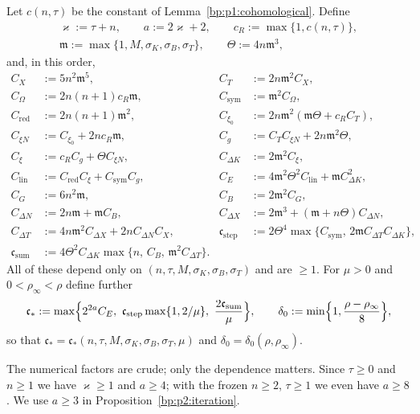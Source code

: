 \begin{definition}\label{bp:p2:constants}
Let $c(n,\tau)$ be the constant of Lemma~\ref{bp:p1:cohomological}. Define
\begin{gather*}
\varkappa:=\tau+n,\qquad a:=2\varkappa+2,\qquad c_R:=\max\{1,c(n,\tau)\},\\
\mathfrak m:=\max\{1,M,\sigma_K,\sigma_B,\sigma_T\},\qquad \Theta:=4n\mathfrak m^3,
\end{gather*}
and, in this order,
\begin{align*}
C_X&:=5n^2\mathfrak m^5, & C_T&:=2n\mathfrak m^2C_X,\\
C_\Omega&:=2n(n+1)c_R\mathfrak m, & C_{\mathrm{sym}}&:=\mathfrak m^2C_\Omega,\\
C_{\mathrm{red}}&:=2n(n+1)\mathfrak m^2, & C_{\xi_0}&:=2n\mathfrak m^2(\mathfrak m\Theta+c_RC_T),\\
C_{\xi N}&:=C_{\xi_0}+2nc_R\mathfrak m, & C_g&:=C_TC_{\xi N}+2n\mathfrak m^2\Theta,\\
C_\xi&:=c_RC_g+\Theta C_{\xi N}, & C_{\Delta K}&:=2\mathfrak m^2C_\xi,\\
C_{\mathrm{lin}}&:=C_{\mathrm{red}}C_\xi+C_{\mathrm{sym}}C_g, &
  C_E&:=4\mathfrak m^2\Theta^2C_{\mathrm{lin}}+\mathfrak mC_{\Delta K}^2,\\
C_G&:=6n^2\mathfrak m, & C_B&:=2\mathfrak m^2C_G,\\
C_{\Delta N}&:=2n\mathfrak m+\mathfrak mC_B, & C_{\Delta X}&:=2\mathfrak m^3+(\mathfrak m+n\Theta)C_{\Delta N},\\
C_{\Delta T}&:=4n\mathfrak m^2C_{\Delta X}+2nC_{\Delta N}C_X, &
  \mathfrak c_{\mathrm{step}}&:=2\Theta^4\max\{C_{\mathrm{sym}},\,2\mathfrak mC_{\Delta T}C_{\Delta K}\},\\
\mathfrak c_{\mathrm{sum}}&:=4\Theta^2C_{\Delta K}\max\{n,\,C_B,\,\mathfrak m^2C_{\Delta T}\}.
\end{align*}
All of these depend only on $(n,\tau,M,\sigma_K,\sigma_B,\sigma_T)$ and are $\ge1$. For $\mu>0$ and
$0<\rho_\infty<\rho$ define further
\[
\mathfrak c_*:=\max\Bigl\{2^{2a}C_E,\ \mathfrak c_{\mathrm{step}}\max\{1,2/\mu\},\
\frac{2\mathfrak c_{\mathrm{sum}}}{\mu}\Bigr\},\qquad
\delta_0:=\min\Bigl\{1,\frac{\rho-\rho_\infty}{8}\Bigr\},
\]
so that $\mathfrak c_*=\mathfrak c_*(n,\tau,M,\sigma_K,\sigma_B,\sigma_T,\mu)$ and
$\delta_0=\delta_0(\rho,\rho_\infty)$.
\end{definition}

The numerical factors are crude; only the dependence matters. Since $\tau\ge0$ and $n\ge1$ we have
$\varkappa\ge1$ and $a\ge4$; with the frozen $n\ge2$, $\tau\ge1$ we even have $a\ge8$. We use $a\ge3$
in Proposition~\ref{bp:p2:iteration}.

